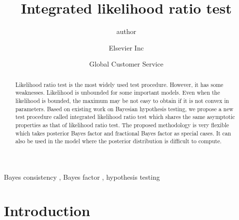 \documentclass[3p]{elsarticle}
\theoremstyle{plain}
\theoremstyle{definition}
\theoremstyle{remark}
\begin{document}
\begin{frontmatter}

\title{Integrated likelihood ratio test}

\author{author }
\address{Radarweg 29, Amsterdam}

\author[mymainaddress,mysecondaryaddress]{Elsevier Inc}

\author[mysecondaryaddress]{Global Customer Service}

\address[mymainaddress]{1600 John F Kennedy Boulevard, Philadelphia}
\address[mysecondaryaddress]{360 Park Avenue South, New York}

\begin{abstract}

    Likelihood ratio test is the most widely used test procedure.
    However, it has some weaknesses.
    Likelihood is unbounded for some important models.
    Even when the likelihood is bounded, the maximum may be not easy to obtain if it is not convex in parameters.
    Based on existing work on Bayesian hypothesis testing,
    we propose a new test procedure called integrated likelihood ratio test which shares the same asymptotic properties as that of likelihood ratio test.
    The proposed methodology is very flexible which takes posterior Bayes factor and fractional Bayes factor as special cases.
    It can also be used in the model where the posterior distribution is difficult to compute.
\end{abstract}

\begin{keyword}
    Bayes consistency \sep
   Bayes factor \sep
 hypothesis testing 
    
\end{keyword}

\end{frontmatter}


\section{Introduction}
\end{document}
